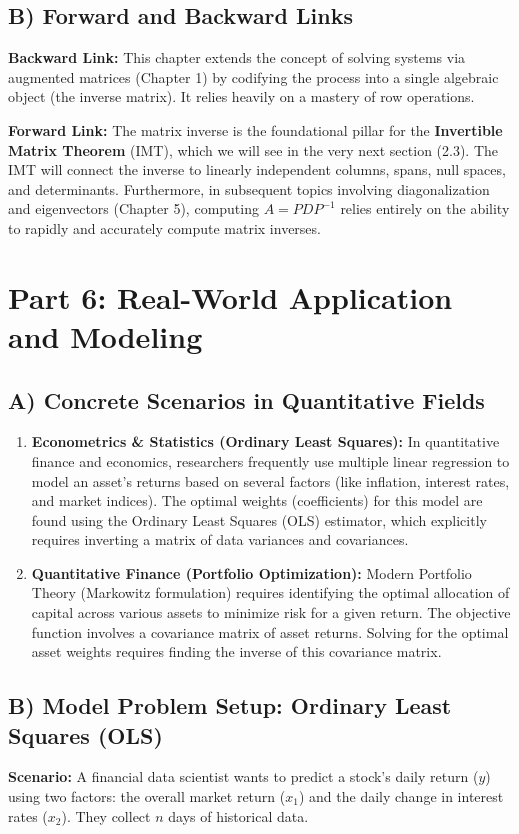 \documentclass[12pt]{article}
\begin{document}
\subsection{B) Forward and Backward Links}
\textbf{Backward Link:} This chapter extends the concept of solving systems via augmented matrices (Chapter 1) by codifying the process into a single algebraic object (the inverse matrix). It relies heavily on a mastery of row operations.

\textbf{Forward Link:} The matrix inverse is the foundational pillar for the \textbf{Invertible Matrix Theorem} (IMT), which we will see in the very next section (2.3). The IMT will connect the inverse to linearly independent columns, spans, null spaces, and determinants. Furthermore, in subsequent topics involving diagonalization and eigenvectors (Chapter 5), computing $A = PDP^{-1}$ relies entirely on the ability to rapidly and accurately compute matrix inverses.

\newpage
\section{Part 6: Real-World Application and Modeling}

\subsection{A) Concrete Scenarios in Quantitative Fields}
\begin{enumerate}
    \item \textbf{Econometrics \& Statistics (Ordinary Least Squares):} In quantitative finance and economics, researchers frequently use multiple linear regression to model an asset's returns based on several factors (like inflation, interest rates, and market indices). The optimal weights (coefficients) for this model are found using the Ordinary Least Squares (OLS) estimator, which explicitly requires inverting a matrix of data variances and covariances.
    \item \textbf{Quantitative Finance (Portfolio Optimization):} Modern Portfolio Theory (Markowitz formulation) requires identifying the optimal allocation of capital across various assets to minimize risk for a given return. The objective function involves a covariance matrix of asset returns. Solving for the optimal asset weights requires finding the inverse of this covariance matrix.
\end{enumerate}

\subsection{B) Model Problem Setup: Ordinary Least Squares (OLS)}
\textbf{Scenario:} A financial data scientist wants to predict a stock's daily return ($y$) using two factors: the overall market return ($x_1$) and the daily change in interest rates ($x_2$). They collect $n$ days of historical data.
\end{document}
